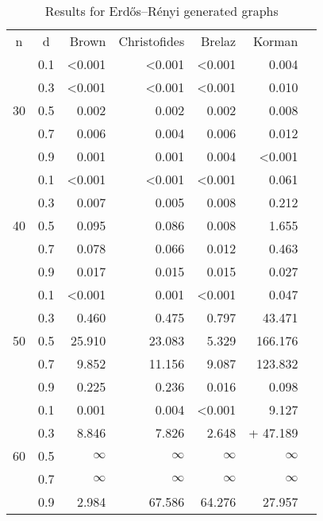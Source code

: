\begin{table}
\centering
\caption{Results for Erdős–Rényi generated graphs}
\label{tab:tab1}
\setlength{\tabcolsep}{1.1em} %
\renewcommand{\arraystretch}{1.2}%
\begin{tabular}{|c|c|rrrr|l}
\cline{1-6}
n & d & \multicolumn{1}{r|}{Brown} & \multicolumn{1}{r|}{Christofides} & \multicolumn{1}{r|}{Brelaz} & Korman &  \\ \cline{1-6}
\multirow{5}{*}{30} & 0.1 & \textless{}0.001 & \textless{}0.001 & \textless{}0.001 & 0.004 &  \\
 & 0.3 & \textless{}0.001 & \textless{}0.001 & \textless{}0.001 & 0.010 &  \\
 & 0.5 & 0.002 & 0.002 & 0.002 & 0.008 &  \\
 & 0.7 & 0.006 & 0.004 & 0.006 & 0.012 &  \\
 & 0.9 & 0.001 & 0.001 & 0.004 & \textless{}0.001 &  \\ \cline{1-6}
\multirow{5}{*}{40} & 0.1 & \textless{}0.001 & \textless{}0.001 & \textless{}0.001 & 0.061 &  \\
 & 0.3 & 0.007 & 0.005 & 0.008 & 0.212 &  \\
 & 0.5 & 0.095 & 0.086 & 0.008 & 1.655 &  \\
 & 0.7 & 0.078 & 0.066 & 0.012 & 0.463 &  \\
 & 0.9 & 0.017 & 0.015 & 0.015 & 0.027 &  \\ \cline{1-6}
\multirow{5}{*}{50} & 0.1 & \textless{}0.001 & 0.001 & \textless{}0.001 & 0.047 &  \\
 & 0.3 & 0.460 & 0.475 & 0.797 & 43.471 &  \\
 & 0.5 & 25.910 & 23.083 & 5.329 & 166.176 &  \\
 & 0.7 & 9.852 & 11.156 & 9.087 & 123.832 &  \\
 & 0.9 & 0.225 & 0.236 & 0.016 & 0.098 &  \\ \cline{1-6}
\multirow{5}{*}{60} & 0.1 & 0.001 & 0.004 & \textless{}0.001 & 9.127 &  \\
 & 0.3 & 8.846 & 7.826 & 2.648 & + 47.189 &  \\
 & 0.5 & $\infty$ & $\infty$ & $\infty$ & $\infty$ &  \\
 & 0.7 & $\infty$ & $\infty$ & $\infty$ & $\infty$ &  \\
 & 0.9 & 2.984 & 67.586 & 64.276 & 27.957 &  \\ \cline{1-6}
\end{tabular}
\end{table}

